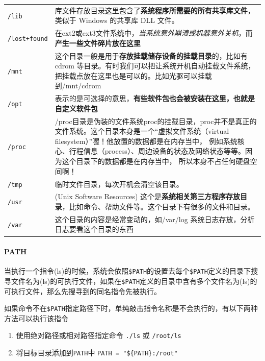 \documentclass[UTF8,a4paper,12pt]{ctexbook}
\begin{document}
\begin{table}
\begin{longtable}{l|m{14cm}}
							\verb|/lib|		&	库文件存放目录这里包含了\textbf{系统程序所需要的所有共享库文件}，类似于 Windows 的共享库 DLL 文件。			\\
							\verb|/lost+found|	&	在ext2或ext3文件系统中，\textit{当系统意外崩溃或机器意外关机}，而\textbf{产生一些文件碎片放在这里}			\\
							\verb|/mnt|		&	这个目录一般是用于\textbf{存放挂载储存设备的挂载目录}的，比如有cdrom 等目录。有时我们可以把让系统开机自动挂载文件系统，把挂载点放在这里也是可以的。比如光驱可以挂载到/mnt/cdrom 			\\
							\verb|/opt|		&	表示的是可选择的意思，\textbf{有些软件包也会被安装在这里，也就是自定义软件包}\\
							\verb|/proc|		&	/proc目录是伪装的文件系统proc的挂载目录，proc并不是真正的文件系统。这个目录本身是一个“虚拟文件系统（virtual filesystem）”喔！他放置的数据都是在内存当中， 例如系统核心、行程信息（process）、周边设备的状态及网络状态等等。因为这个目录下的数据都是在内存当中， 所以本身不占任何硬盘空间啊！\\
							\verb|/tmp|		&	临时文件目录，每次开机会清空该目录。			\\
							\verb|/usr|		& (Unix Software Resources)	这个是\textbf{系统相关第三方程序存放目录}，比如命令、帮助文件等。这个目录下有很多的文件和目录。			\\
							\verb|/var |		&	这个目录的内容是经常变动的，如/var/log 系统日志存放，分析日志要看这个目录的东西\\
						\hline
				\end{longtable}
			\end{table}
			\paragraph{PATH}
				当执行一个指令(ls)的时候，系统会依照\verb|$PATH|的设置去每个\verb|$PATH|定义的目录下搜寻文件名为(ls)的可执行文件，如果在\verb|$PATH|定义的目录中含有多个文件名为(ls)的可执行文件，那么先搜寻到的同名指令先被执行。
				
				如果命令不在\verb|$PATH|指定路径下时，单纯敲击指令名称是不会执行的，有以下两种方法可以执行该指令
					\begin{enumerate}
						\item 使用绝对路径或相对路径指定命令 \verb|./ls| 或 \verb|/root/ls|
						\item 将目标目录添加到\verb|PATH|中 \verb|PATH = "${PATH}:/root"|
					\end{enumerate}
			
\end{document}
